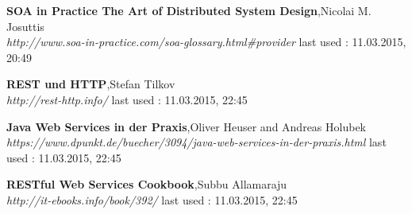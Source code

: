 \documentclass[12pt]{article}
\begin{document}
\begin{thebibliography}{56}
   \textbf{SOA in Practice
The Art of Distributed System Design},Nicolai M. Josuttis\\
  \textit{http://www.soa-in-practice.com/soa-glossary.html\#provider}
  \newline last used : 11.03.2015, 20:49 

  \textbf{REST und HTTP},Stefan Tilkov\\
  \textit{http://rest-http.info/}
  \newline last used : 11.03.2015, 22:45 

  \textbf{Java Web Services in der Praxis},Oliver Heuser and Andreas Holubek\\
  \textit{https://www.dpunkt.de/buecher/3094/java-web-services-in-der-praxis.html}
  \newline last used : 11.03.2015, 22:45

  \textbf{RESTful Web Services Cookbook},Subbu Allamaraju\\
  \textit{http://it-ebooks.info/book/392/}
  \newline last used : 11.03.2015, 22:45



 	 
 	 
 	 
 	 
\end{thebibliography}
\end{document}
